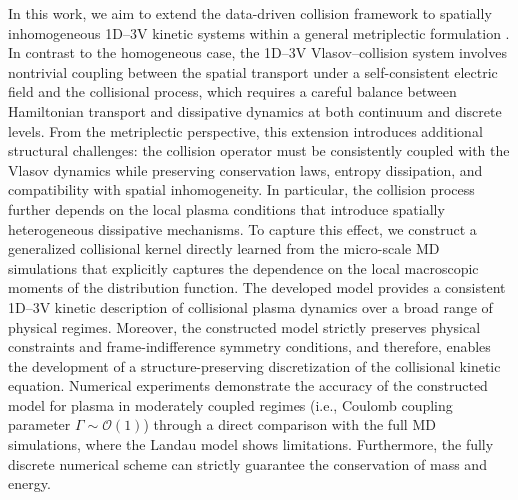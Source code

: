 \documentclass[preprint,1p,times]{elsarticle}
\theoremstyle{definition}
\theoremstyle{remark}
\begin{document}
In this work, we aim to extend the data-driven collision framework to spatially inhomogeneous 1D–3V kinetic systems within a general metriplectic formulation \cite{morrison1986paradigm,grmela1997dynamics}.
In contrast to the homogeneous case, the 1D–3V Vlasov–collision system involves nontrivial coupling between the spatial transport under a self-consistent electric field and the collisional process, which requires a careful balance between Hamiltonian transport and dissipative dynamics at both continuum and discrete levels.
From the metriplectic perspective, this extension introduces additional structural challenges: the collision operator must be consistently coupled with the Vlasov dynamics while preserving conservation laws, entropy dissipation, and compatibility with spatial inhomogeneity. 
In particular, the collision process further depends on the local plasma conditions that introduce spatially heterogeneous dissipative mechanisms. 
To capture this effect, we construct a generalized collisional kernel directly learned from the micro-scale MD simulations that explicitly captures the dependence on the local macroscopic moments of the distribution function. 
%
The developed model provides a consistent 1D–3V kinetic description of collisional plasma dynamics over a broad range of physical regimes. 
Moreover, the constructed model strictly preserves physical constraints and frame-indifference symmetry conditions, and therefore, enables the development of a structure-preserving discretization of the collisional kinetic equation.  
%
Numerical experiments demonstrate the accuracy of the constructed model for plasma in moderately coupled regimes (i.e., Coulomb coupling parameter $\Gamma \sim \mathcal{O}(1)$) through a direct comparison with the full MD simulations, where the Landau model shows limitations. 
Furthermore, the fully discrete numerical scheme can strictly guarantee the conservation of mass and energy.
\end{document}
